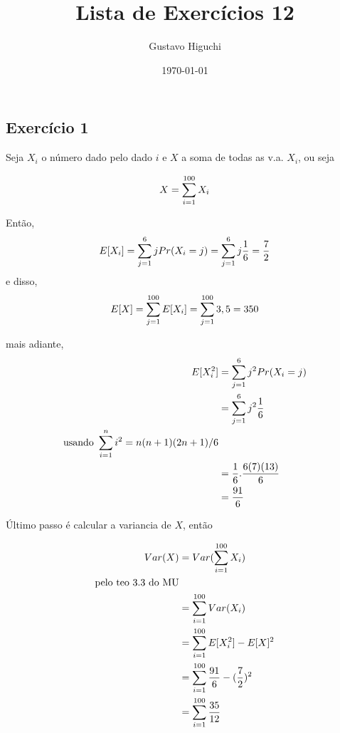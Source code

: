 \documentclass{article}
\title{Lista de Exercícios 12}
\author{Gustavo Higuchi}
\date{\today}
\begin{document}
\maketitle

\tableofcontents
\newpage


\chapter{}
\section{Exercício 1}
Seja $X_i$ o número dado pelo dado $i$ e $X$ a soma de todas as v.a. $X_i$, ou seja

\begin{equation}
	\notag
	X = \sum\limits_{i=1}^{100} X_i
\end{equation}

Então, 
\begin{equation}
	\notag
	E[X_i] = \sum\limits_{j=1}^6 jPr(X_i = j) = \sum\limits_{j=1}^6 j\dfrac{1}{6} = \dfrac{7}{2}
\end{equation}
e disso,
\begin{equation}
	\notag
	E[X] = \sum\limits_{j=1}^{100} E[X_i] = \sum\limits_{j=1}^{100} 3,5 = 350
\end{equation}

mais adiante,
\begin{equation}
	\notag
	\begin{split}
		E[X_i^2] &= \sum\limits_{j=1}^{6}j^2Pr(X_i = j)\\
		&= \sum\limits_{j=1}^{6}j^2 \dfrac{1}{6}\\
		\text{usando } \sum_{i=1}^ni^2 = n(n+1)(2n+1)/6 &\\
		&= \dfrac{1}{6} . \dfrac{6(7)(13)}{6}\\
		&= \dfrac{91}{6}
	\end{split}
\end{equation}

Último passo é calcular a variancia de $X$, então

\begin{equation}
\notag
	\begin{split}
		Var(X) &= Var(\sum\limits_{i=1}^{100}X_i)\\
		\text{pelo teo 3.3 do MU} &\\
		&= \sum\limits_{i=1}^{100}Var(X_i)\\
		&= \sum\limits_{i=1}^{100}E[X_i^2] - E[X]^2\\
		&= \sum\limits_{i=1}^{100}\dfrac{91}{6} - (\dfrac{7}{2})^2\\
		&= \sum\limits_{i=1}^{100}\dfrac{35}{12}
	\end{split}
\end{equation}
\end{document}
